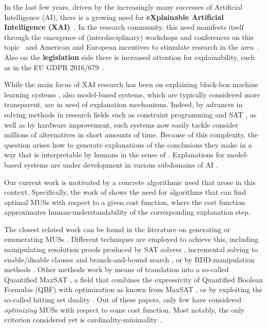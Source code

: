 
In the last few years, driven by the increasingly many successes of Artificial Intelligence (AI), there is a growing need for \textbf{eXplainable Artificial Intelligence (XAI)}~\cite{miller2019explanation}.
In the research community, this need manifests itself through the emergence of (interdisciplinary) workshops and conferences on this topic~\cite{xai-ijcai,FAT} and American and European incentives to stimulate research in the area~\cite{gunning2017explainable,hamonrobustness,chistera,fetproact}. 
Also on the \textbf{legislation} side there is increased attention for explainability, such as in the EU GDPR 2016/679~\cite{regulation2016regulation}.

While the main focus of XAI research has been on explaining black-box machine learning systems \cite{Barredo_Arrieta_2020,Adadi_2018}, also model-based systems, which are typically considered more transparent, are in need of explanation mechanisms. 
Indeed, by advances in solving methods in research fields such as constraint programming \cite{CP} and SAT \cite{DBLP:series/faia/2009-185}, as well as by hardware improvement, such systems now easily tackle consider millions of alternatives in short amounts of time. 
Because of this complexity, the question arises how to generate explanations of the conclusions they make in a way that is interpretable by humans in the sense of \citet{DBLP:conf/dsaa/GilpinBYBSK18}. 
Explanations for model-based systems are under development in various subdomains of AI \cite{fox2017explainable,vcyras2019argumentation,chakraborti2017plan,winston2004operations,putnam2019toward}.

Our current work is motivated by a concrete algorithmic need that arose in this context. 
Specifically, the work of \citet{ecai/BogaertsGCG20} shows the need for algorithms that can find optimal MUSs with respect to a given cost function, where the cost function approximates human-understandability of the corresponding explanation step.

The closest related work can be found in the literature on generating or enumerating MUSs \cite{conf/sat/LynceM04}.
Different techniques are employed to achieve this, including  manipulating resolution proofs produced by SAT solvers \cite{goldberg,DBLP:journals/fmsd/GershmanKS08,DBLP:conf/sat/DershowitzHN06}, incremental solving to enable/disable clauses and branch-and-bound search \cite{DBLP:conf/dac/OhMASM04}, or by BDD-manipulation methods \cite{huang}.
Other methods work by means of translation into a so-called Quantified MaxSAT \cite{DBLP:journals/constraints/IgnatievJM16}, a field that combines the expressivity of Quantified Boolean Formulas (QBF)  with optimization as known from MaxSAT , or by exploiting the so-called hitting set duality \cite{ignatiev2015smallest}. 
Out of these papers, only few have considered \emph{optimizing} MUSs with respect to some cost function. Most notably, the only criterion considered yet is cardinality-minimality \cite{conf/sat/LynceM04,ignatiev2015smallest,DBLP:journals/constraints/IgnatievJM16}. 

